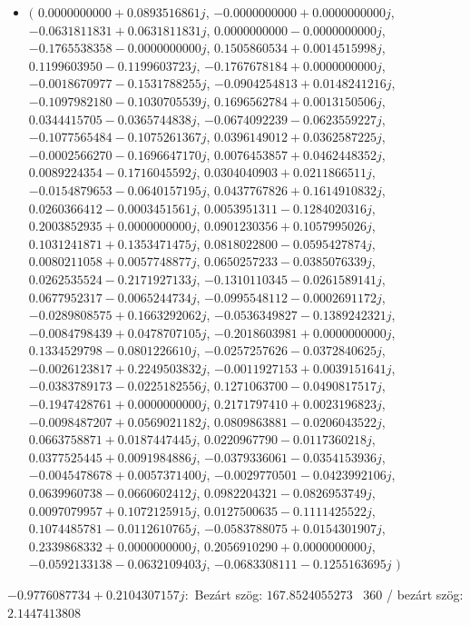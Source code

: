\documentclass[14pt,a4paper]{article}
\begin{document}
\begin{itemize}
\item
$\big($
$0.0000000000+0.0893516861j$, $-0.0000000000+0.0000000000j$, $-0.0631811831+0.0631811831j$, $0.0000000000-0.0000000000j$, $-0.1765538358-0.0000000000j$, $0.1505860534+0.0014515998j$, $0.1199603950-0.1199603723j$, $-0.1767678184+0.0000000000j$, $-0.0018670977-0.1531788255j$, $-0.0904254813+0.0148241216j$, $-0.1097982180-0.1030705539j$, $0.1696562784+0.0013150506j$, $0.0344415705-0.0365744838j$, $-0.0674092239-0.0623559227j$, $-0.1077565484-0.1075261367j$, $0.0396149012+0.0362587225j$, $-0.0002566270-0.1696647170j$, $0.0076453857+0.0462448352j$, $0.0089224354-0.1716045592j$, $0.0304040903+0.0211866511j$, $-0.0154879653-0.0640157195j$, $0.0437767826+0.1614910832j$, $0.0260366412-0.0003451561j$, $0.0053951311-0.1284020316j$, $0.2003852935+0.0000000000j$, $0.0901230356+0.1057995026j$, $0.1031241871+0.1353471475j$, $0.0818022800-0.0595427874j$, $0.0080211058+0.0057748877j$, $0.0650257233-0.0385076339j$, $0.0262535524-0.2171927133j$, $-0.1310110345-0.0261589141j$, $0.0677952317-0.0065244734j$, $-0.0995548112-0.0002691172j$, $-0.0289808575+0.1663292062j$, $-0.0536349827-0.1389242321j$, $-0.0084798439+0.0478707105j$, $-0.2018603981+0.0000000000j$, $0.1334529798-0.0801226610j$, $-0.0257257626-0.0372840625j$, $-0.0026123817+0.2249503832j$, $-0.0011927153+0.0039151641j$, $-0.0383789173-0.0225182556j$, $0.1271063700-0.0490817517j$, $-0.1947428761+0.0000000000j$, $0.2171797410+0.0023196823j$, $-0.0098487207+0.0569021182j$, $0.0809863881-0.0206043522j$, $0.0663758871+0.0187447445j$, $0.0220967790-0.0117360218j$, $0.0377525445+0.0091984886j$, $-0.0379336061-0.0354153936j$, $-0.0045478678+0.0057371400j$, $-0.0029770501-0.0423992106j$, $0.0639960738-0.0660602412j$, $0.0982204321-0.0826953749j$, $0.0097079957+0.1072125915j$, $0.0127500635-0.1111425522j$, $0.1074485781-0.0112610765j$, $-0.0583788075+0.0154301907j$, $0.2339868332+0.0000000000j$, $0.2056910290+0.0000000000j$, $-0.0592133138-0.0632109403j$, $-0.0683308111-0.1255163695j$
$\big)$
\end{itemize}
$-0.9776087734+0.2104307157j$:\
Bezárt szög: $167.8524055273$ \
360 / bezárt szög: $2.1447413808$\
\end{document}
